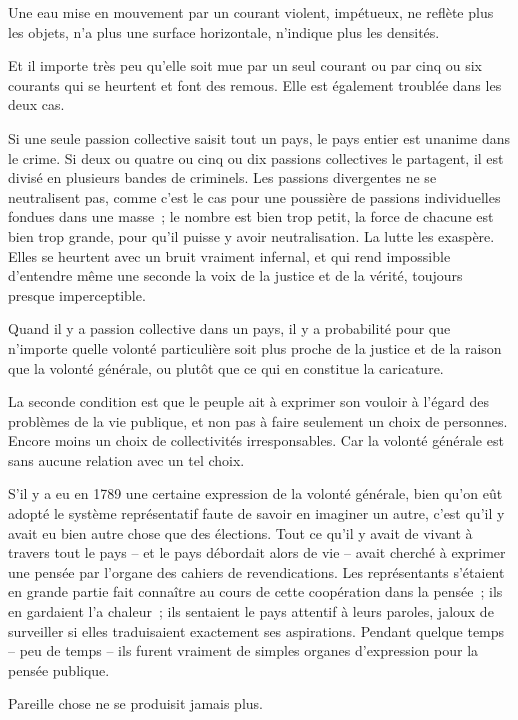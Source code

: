 \documentclass[french,twoside]{book} %
\begin{document}
Une eau mise en mouvement par un courant violent, impétueux, ne reflète plus les objets, n’a plus une surface horizontale, n’indique plus les densités.\par
Et il importe très peu qu’elle soit mue par un seul courant ou par cinq ou six courants qui se heurtent et font des remous. Elle est également troublée dans les deux cas.\par
Si une seule passion collective saisit tout un pays, le pays entier est unanime dans le crime. Si deux ou quatre ou cinq ou dix passions collectives le partagent, il est divisé en plusieurs bandes de criminels. Les passions divergentes ne se neutralisent pas, comme c’est le cas pour une poussière de passions individuelles fondues dans une masse ; le nombre est bien trop petit, la force de chacune est bien trop grande, pour qu’il puisse y avoir neutralisation. La lutte les exaspère. Elles se heurtent avec un bruit vraiment infernal, et qui rend impossible d’entendre même une seconde la voix de la justice et de la vérité, toujours presque imperceptible.\par
Quand il y a passion collective dans un pays, il y a probabilité pour que n’importe quelle volonté particulière soit plus proche de la justice et de la raison que la volonté générale, ou plutôt que ce qui en constitue la caricature.\par
La seconde condition est que le peuple ait à exprimer son vouloir à l’égard des problèmes de la vie publique, et non pas à faire seulement un choix de personnes. Encore moins un choix de collectivités irresponsables. Car la volonté générale est sans aucune relation avec un tel choix.\par
S’il y a eu en 1789 une certaine expression de la volonté générale, bien qu’on eût adopté le système représentatif faute de savoir en imaginer un autre, c’est qu’il y avait eu bien autre chose que des élections. Tout ce qu’il y avait de vivant à travers tout le pays – et le pays débordait alors de vie – avait cherché à exprimer une pensée par l’organe des cahiers de revendications. Les représentants s’étaient en grande partie fait connaître au cours de cette coopération dans la pensée ; ils en gardaient l’a chaleur ; ils sentaient le pays attentif à leurs paroles, jaloux de surveiller si elles traduisaient exactement ses aspirations. Pendant quelque temps – peu de temps – ils furent vraiment de simples organes d’expression pour la pensée publique.\par
Pareille chose ne se produisit jamais plus.\par
\end{document}

